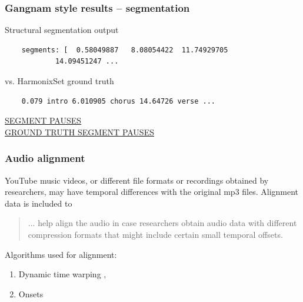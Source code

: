 \documentclass{beamer}
\begin{document}

\begin{frame}[fragile]
	\frametitle{Gangnam style results -- segmentation}
	Structural segmentation output
	\begin{verbatim}
	segments: [  0.58049887   8.08054422  11.74929705 
            14.09451247 ...
	\end{verbatim}
	vs. HarmonixSet ground truth
	\begin{verbatim}
	0.079 intro 6.010905 chorus 14.64726 verse ...
	\end{verbatim}
	\href{run:./gangnam_segments.wav}{SEGMENT PAUSES}\\
	\href{run:./gangnam_segments_truth.wav}{GROUND TRUTH SEGMENT PAUSES}
\end{frame}


\begin{frame}
	\frametitle{Audio alignment}
	YouTube music videos, or different file formats or recordings obtained by researchers, may have temporal differences with the original mp3 files. Alignment data is included to
	\begin{quote}
	... help align the audio in case researchers obtain audio data with different compression formats that might include certain small temporal offsets.
	\end{quote}
	Algorithms used for alignment:
	\begin{enumerate}
		\item
			Dynamic time warping , 
		\item
			Onsets 
	\end{enumerate}
\end{frame}

\end{document}
